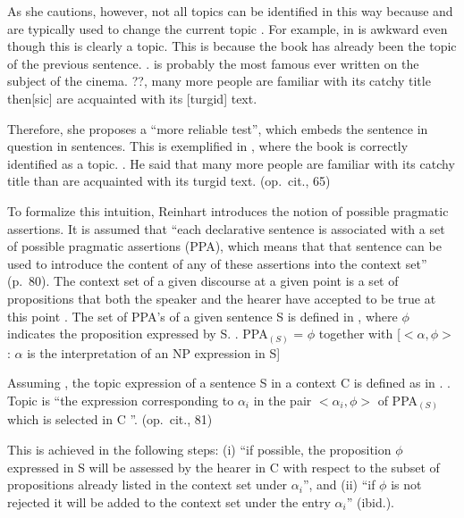 As she cautions, however,
not all topics can be identified in this way
because  and  are typically used to change the current topic \cite{keenanschieffelin76,durantiochs79}.
For example,  in \Next is awkward even though this is clearly a topic.
This is because the book has already been the topic of the previous sentence.
%
\ex.  is probably the most famous ever written on the subject of the cinema.
 ??, many more people are familiar with its catchy title then[sic] are acquainted with its [turgid] text.
 \hfill{\cite[64]{reinhart81}}

Therefore, she proposes a ``more reliable test'',
which embeds the sentence in question in  sentences.
This is exemplified in \Next,
where the book is correctly identified as a topic.
%
\ex. He said  that many more people are familiar with its catchy title than are acquainted with its turgid text.
  \hfill{(op.~cit., 65)}


To formalize this intuition, Reinhart introduces the notion of possible pragmatic assertions.
It is assumed that ``each declarative sentence is associated with a set of possible pragmatic assertions (PPA), which means that that sentence can be used to introduce the content of any of these assertions into the context set'' (p.~80).
The context set of a given discourse at a given point is a set of propositions that both the speaker and the hearer have accepted to be true at this point \cite{stalnaker78}.
The set of PPA's of a given sentence S is defined in \Next,
where $\phi$ indicates the proposition expressed by S.
%
\ex. \label{BackExPPA} PPA$_{(S)}$ = $\phi$ together with [$<\alpha,\phi>$: $\alpha$ is the interpretation of an NP expression in S]
   \hfill{\cite[80-81]{reinhart81}}

Assuming \Last, the topic expression of a sentence S in a context C
is defined as in \Next.
%
\ex. \label{BackExAboutness} Topic is ``the expression corresponding to $\alpha_{i}$ in the pair $<\alpha_{i},\phi>$ of PPA$_{(S)}$ which is selected in C ''.
    \hfill{(op.~cit., 81)}

This is achieved in the following steps:
(i) ``if possible, the proposition $\phi$ expressed in S will be assessed by the hearer in C with respect to the subset of propositions already listed in the context set under $\alpha_{i}$'', and
(ii) ``if $\phi$ is not rejected it will be added to the context set under the entry $\alpha_{i}$'' ({ibid.}).


